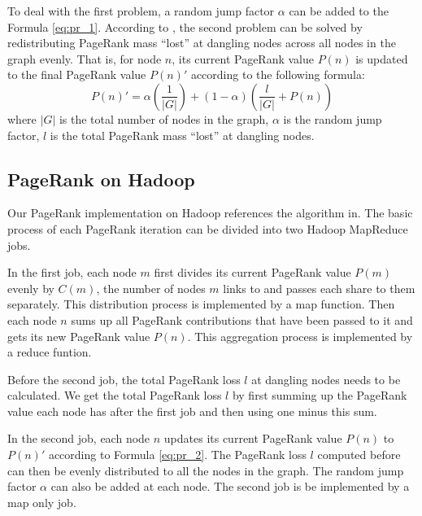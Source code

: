 \documentclass[12pt,conference,letterpaper]{IEEEtran}
\begin{document}
To deal with the first problem, a random jump factor $\alpha$ can be added to the Formula \ref{eq:pr_1}. According to \cite{monica2005}, the second problem can be solved by redistributing PageRank mass ``lost'' at dangling nodes across all nodes in the graph evenly. That is, for node $n$, its current PageRank value $P(n)$ is updated to the final PageRank value $P(n)'$ according to the following formula:
\begin{equation}
P(n)' = \alpha (\frac{1}{|G|}) + (1 - \alpha) (\frac{l}{|G|} + P(n)) \label{eq:pr_2}
\end{equation}
where $|G|$ is the total number of nodes in the graph, $\alpha$ is the random jump factor, $l$ is the total PageRank mass ``lost'' at dangling nodes.


\subsection{PageRank on Hadoop}
Our PageRank implementation on Hadoop references the algorithm in\cite{jimmy2010}. The basic process of each PageRank iteration can be divided into two Hadoop MapReduce jobs.

In the first job, each node $m$ first divides its current PageRank value $P(m)$ evenly by $C(m)$, the number of nodes $m$ links to and passes each share to them separately. This distribution process is implemented by a map function. Then each node $n$ sums up all PageRank contributions that have been passed to it and gets its new PageRank value $P(n)$. This aggregation process is implemented by a reduce funtion.

Before the second job, the total PageRank loss $l$ at dangling nodes needs to be calculated. We get the total PageRank loss $l$ by first summing up the PageRank value each node has after the first job and then using one minus this sum.

In the second job, each node $n$ updates its current PageRank value $P(n)$ to $P(n)'$ according to Formula \ref{eq:pr_2}. The PageRank loss $l$ computed before can then be evenly distributed to all the nodes in the graph. The random jump factor $\alpha$ can also be added at each node. The second job is be implemented by a map only job. 

\end{document}
